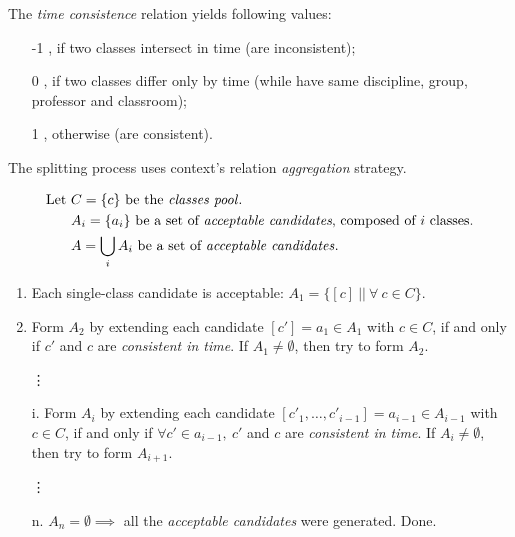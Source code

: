 The \emph{time consistence} relation yields following values:
\begin{itemize}[leftmargin=2cm]
  \item[-1], if two classes intersect in time (are inconsistent);
  \item[0], if two classes differ only by time
            (while have same discipline, group, professor and classroom);
  \item[1], otherwise (are consistent).
\end{itemize}


The splitting process uses context's relation \emph{aggregation} strategy.

\begin{align*}
  \mbox{Let } & C=\lbrace c \rbrace \text{ be the \emph{classes pool}}.\\
            ~ & A_i=\lbrace a_i \rbrace \text{ be a set of \emph{acceptable candidates},
                                         composed of } i \text{ classes.}\\
            ~ & A=\bigcup\limits_{i} A_i \text{ be a set of \emph{acceptable candidates}}.
\end{align*}

\begin{enumerate}
  \item Each single-class candidate is acceptable:
    $A_1 = \lbrace [ c ] ~||~ \forall ~ c \in C \rbrace$.
  \item Form $A_2$ by extending each candidate $[c'] = a_1 \in A_1$ with $c \in C$,
    if and only if $c'$ and $c$ are \emph{consistent in time}.
    If $A_1 \not= \emptyset$, then try to form $A_2$.
  \item[\vdots]
  \item[i.] Form $A_i$ by extending each candidate $[c'_1, \dots, c'_{i-1}] = a_{i-1}
    \in A_{i-1}$ with $c \in C$, if and only if $\forall c' \in a_{i-1}, ~c'$
    and $c$ are \emph{consistent in time}.
    If $A_i \not= \emptyset$, then try to form $A_{i+1}$.
   \item[\vdots]
   \item[n.] $A_n = \emptyset \implies$ all the \emph{acceptable candidates}
     were generated. Done.
\end{enumerate}


